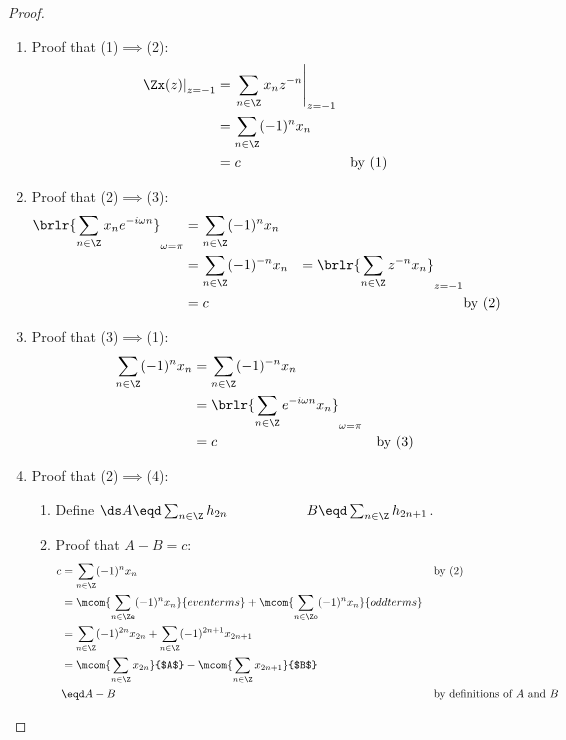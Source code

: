 \begin{proof}
\begin{enumerate}
  \item Proof that (1)$\implies$(2):
    \begin{align*}
      \left.\Zx(z)\right|_{z=-1}
        &= \left.\sum_{n\in\Z} x_n z^{-n} \right|_{z=-1}
      \\&= \sum_{n\in\Z} (-1)^n x_n
      \\&= c
        && \text{by (1)}
    \end{align*}

  \item Proof that (2)$\implies$(3):
    \begin{align*}
      \brlr{\sum_{n\in\Z} x_n e^{-i\omega n}}_{\omega=\pi}
        &= \sum_{n\in\Z} (-1)^n x_n
      \\&= \sum_{n\in\Z} (-1)^{-n} x_n
        &= \brlr{\sum_{n\in\Z} z^{-n} x_n}_{z=-1}
      \\&= c
        && \text{by (2)}
    \end{align*}   

  \item Proof that (3)$\implies$(1):
    \begin{align*}
      \sum_{n\in\Z} (-1)^n x_n 
        &= \sum_{n\in\Z} (-1)^{-n} x_n 
      \\&= \brlr{\sum_{n\in\Z} e^{-i\omega n} x_n}_{\omega=\pi}
      \\&= c
        && \text{by (3)}
    \end{align*}   


  \item Proof that (2)$\implies$(4):
    \begin{enumerate}
      \item Define $\ds A \eqd \sum_{n\in\Z}  h_{2n} \hspace{20mm} B \eqd \sum_{n\in\Z}  h_{2n+1}$.
      
      \item Proof that $A-B=c$:
        \begin{align*}
          c
            &= \sum_{n\in\Z} (-1)^n  x_n
            && \text{by (2)}
          \\&=   \mcom{\sum_{n\in\Ze} (-1)^n  x_n}{even terms}
               + \mcom{\sum_{n\in\Zo} (-1)^n  x_n}{odd terms}
          \\&=   \sum_{n\in\Z} (-1)^{2n}    x_{2n}
               + \sum_{n\in\Z} (-1)^{2n+1}  x_{2n+1}
          \\&=   \mcom{\sum_{n\in\Z}  x_{2n}}{$A$} - \mcom{\sum_{n\in\Z}  x_{2n+1}}{$B$}
          \\&\eqd A-B
            &&  \text{by definitions of $A$ and $B$}
        \end{align*}
      

\end{enumerate}
\end{enumerate}
\end{proof}
